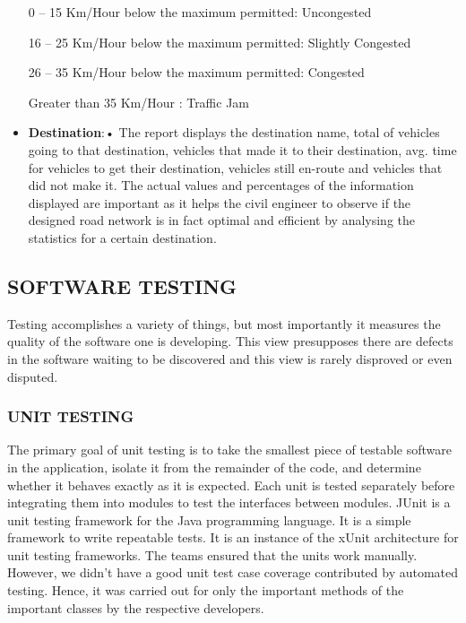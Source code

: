 \documentclass[11pt,a4paper]{article}
\begin{document}
\begin{itemize}
		0 -- 15 Km/Hour below the maximum permitted: Uncongested
  		 
		16 -- 25 Km/Hour below the maximum permitted: Slightly Congested
  		 
		26 -- 35 Km/Hour below the maximum permitted: Congested
  		
  		Greater than 35 Km/Hour : Traffic Jam  
  	
	\item \textbf{Destination}:•	The report displays the destination name, total of vehicles going to that destination, vehicles that made it to their destination, avg. time for vehicles to get their destination, vehicles still en-route and vehicles that did not make it. The actual values and percentages of the information displayed are important as it helps the civil engineer to observe if the designed road network is in fact optimal and efficient by analysing the statistics for a certain destination.
  \end{itemize}
  
\subsection{SOFTWARE TESTING}
	Testing accomplishes a variety of things, but most importantly it
	measures the quality of the software one is developing. This view
	presupposes there are defects in the software waiting to be
	discovered and this view is rarely disproved or even disputed. \cite{testingPurp}
	
	\subsubsection{UNIT TESTING}
	The primary goal of unit testing is to take the smallest piece of
	testable software in the application, isolate it from the remainder
	of the code, and determine whether it behaves exactly as it is
	expected. Each unit is tested separately before integrating them
	into modules to test the interfaces between modules. \cite{mdsn03}
	JUnit is a unit testing framework for the Java programming
	language.\cite{junitwiki} It is a simple framework to write
	repeatable tests. It is an instance of the xUnit architecture for
	unit testing frameworks.	\cite{junit}
	The teams ensured that the units work manually. However, we didn’t have
	a good unit test case coverage contributed by automated testing. Hence,
	it was carried out for only the important methods of the important
	classes by the respective developers.
	
\end{document}
